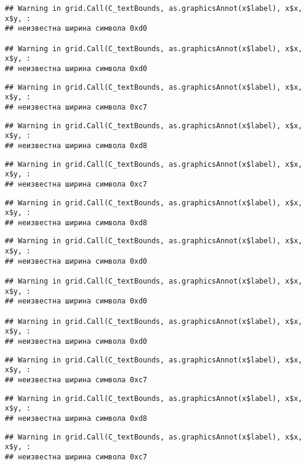 \documentclass[
]{article}
\begin{document}
\begin{verbatim}
## Warning in grid.Call(C_textBounds, as.graphicsAnnot(x$label), x$x, x$y, :
## неизвестна ширина символа 0xd0

## Warning in grid.Call(C_textBounds, as.graphicsAnnot(x$label), x$x, x$y, :
## неизвестна ширина символа 0xd0
\end{verbatim}

\begin{verbatim}
## Warning in grid.Call(C_textBounds, as.graphicsAnnot(x$label), x$x, x$y, :
## неизвестна ширина символа 0xc7
\end{verbatim}

\begin{verbatim}
## Warning in grid.Call(C_textBounds, as.graphicsAnnot(x$label), x$x, x$y, :
## неизвестна ширина символа 0xd8
\end{verbatim}

\begin{verbatim}
## Warning in grid.Call(C_textBounds, as.graphicsAnnot(x$label), x$x, x$y, :
## неизвестна ширина символа 0xc7
\end{verbatim}

\begin{verbatim}
## Warning in grid.Call(C_textBounds, as.graphicsAnnot(x$label), x$x, x$y, :
## неизвестна ширина символа 0xd8
\end{verbatim}

\begin{verbatim}
## Warning in grid.Call(C_textBounds, as.graphicsAnnot(x$label), x$x, x$y, :
## неизвестна ширина символа 0xd0

## Warning in grid.Call(C_textBounds, as.graphicsAnnot(x$label), x$x, x$y, :
## неизвестна ширина символа 0xd0

## Warning in grid.Call(C_textBounds, as.graphicsAnnot(x$label), x$x, x$y, :
## неизвестна ширина символа 0xd0
\end{verbatim}

\begin{verbatim}
## Warning in grid.Call(C_textBounds, as.graphicsAnnot(x$label), x$x, x$y, :
## неизвестна ширина символа 0xc7
\end{verbatim}

\begin{verbatim}
## Warning in grid.Call(C_textBounds, as.graphicsAnnot(x$label), x$x, x$y, :
## неизвестна ширина символа 0xd8
\end{verbatim}

\begin{verbatim}
## Warning in grid.Call(C_textBounds, as.graphicsAnnot(x$label), x$x, x$y, :
## неизвестна ширина символа 0xc7
\end{verbatim}
\end{document}

